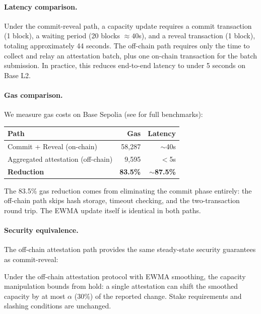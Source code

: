 \paragraph{Latency comparison.}
Under the commit-reveal path, a capacity update requires a commit transaction
(1 block), a waiting period (20 blocks $\approx 40$s), and a reveal transaction
(1 block), totaling approximately 44 seconds. The off-chain path requires only
the time to collect and relay an attestation batch, plus one on-chain transaction
for the batch submission. In practice, this reduces end-to-end latency to
under 5 seconds on Base L2.

\paragraph{Gas comparison.}
We measure gas costs on Base Sepolia (see  for full benchmarks):

\begin{center}
\begin{tabular}{lrr}
\toprule
\textbf{Path} & \textbf{Gas} & \textbf{Latency} \\
\midrule
Commit + Reveal (on-chain) & 58{,}287 & $\sim$40s \\
Aggregated attestation (off-chain) & 9{,}595 & $<$5s \\
\midrule
\textbf{Reduction} & \textbf{83.5\%} & \textbf{$\sim$87.5\%} \\
\bottomrule
\end{tabular}
\end{center}

The 83.5\% gas reduction comes from eliminating the commit phase entirely:
the off-chain path skips hash storage, timeout checking, and the two-transaction
round trip. The EWMA update itself is identical in both paths.

\paragraph{Security equivalence.}
The off-chain attestation path provides the same steady-state security
guarantees as commit-reveal:

\begin{proposition}
\label{prop:offchain-security}
Under the off-chain attestation protocol with EWMA smoothing, the capacity
manipulation bounds from  hold: a single attestation can
shift the smoothed capacity by at most $\alpha$ (30\%) of the reported change.
Stake requirements and slashing conditions are unchanged.
\end{proposition}

